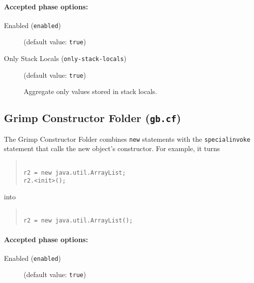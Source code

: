 \documentclass{article}
\begin{document}
\paragraph{Accepted phase options:} 

\begin{description}

\item[Enabled ({\tt enabled})]
(default value: {\tt true})






\item[Only Stack Locals ({\tt only-stack-locals})]
(default value: {\tt true})




Aggregate only values stored in stack locals.



\end{description}

\subsection{Grimp Constructor Folder ({\tt gb.cf})}

The Grimp Constructor Folder combines {\tt new} statements
with the {\tt specialinvoke} statement that calls the new
object's constructor. For example, it turns

\begin{quote}\begin{verbatim}

r2 = new java.util.ArrayList;
r2.<init>();

\end{verbatim}\end{quote}

into

\begin{quote}\begin{verbatim}

r2 = new java.util.ArrayList();

\end{verbatim}\end{quote}



\paragraph{Accepted phase options:} 

\begin{description}

\item[Enabled ({\tt enabled})]
(default value: {\tt true})






\end{description}
\end{document}
